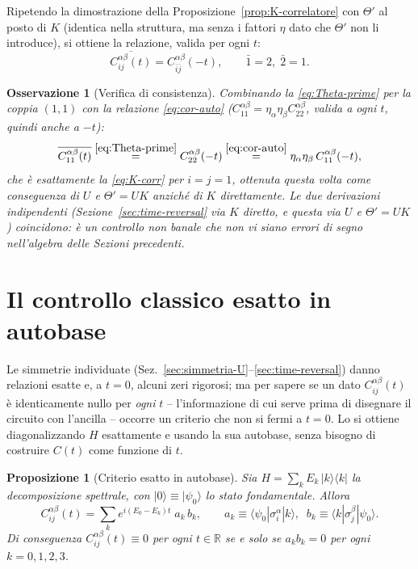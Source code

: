 \documentclass[11pt,a4paper]{article}
\newtheorem{proposizione}{Proposizione}
\newtheorem{osservazione}{Osservazione}
\begin{document}
Ripetendo la dimostrazione della Proposizione~\ref{prop:K-correlatore} con $\Theta'$ al posto di
$K$ (identica nella struttura, ma senza i fattori $\eta$ dato che $\Theta'$ non li introduce),
si ottiene la relazione, valida per ogni $t$:
\begin{equation}
\overline{C_{ij}^{\alpha\beta}(t)} = C_{\bar i\bar j}^{\alpha\beta}(-t),
\qquad \bar 1=2,\;\bar 2=1.
\label{eq:Theta-prime}
\end{equation}

\begin{osservazione}[Verifica di consistenza]
Combinando la \eqref{eq:Theta-prime} per la coppia $(1,1)$ con la relazione
\eqref{eq:cor-auto} ($C_{11}^{\alpha\beta}=\eta_\alpha\eta_\beta C_{22}^{\alpha\beta}$, valida a
ogni $t$, quindi anche a $-t$):
\begin{equation}
\overline{C_{11}^{\alpha\beta}(t)} \overset{\eqref{eq:Theta-prime}}{=} C_{22}^{\alpha\beta}(-t)
\overset{\eqref{eq:cor-auto}}{=} \eta_\alpha\eta_\beta\,C_{11}^{\alpha\beta}(-t),
\end{equation}
che è \emph{esattamente} la \eqref{eq:K-corr} per $i=j=1$, ottenuta questa volta come
conseguenza di $U$ e $\Theta'=UK$ anziché di $K$ direttamente. Le due derivazioni indipendenti
(Sezione~\ref{sec:time-reversal} via $K$ diretto, e questa via $U$ e $\Theta'=UK$) coincidono:
è un controllo non banale che non vi siano errori di segno nell'algebra delle Sezioni
precedenti.
\end{osservazione}

\section{Il controllo classico esatto in autobase}
\label{sec:controllo-numerico}

Le simmetrie individuate (Sez.~\ref{sec:simmetria-U}--\ref{sec:time-reversal}) danno relazioni
esatte e, a $t=0$, alcuni zeri rigorosi; ma per sapere se un dato $C_{ij}^{\alpha\beta}(t)$ è
identicamente nullo per \emph{ogni} $t$ -- l'informazione di cui serve prima di disegnare il
circuito con l'ancilla -- occorre un criterio che non si fermi a $t=0$. Lo si ottiene
diagonalizzando $H$ esattamente e usando la sua autobase, senza bisogno di costruire $C(t)$ come
funzione di $t$.

\begin{proposizione}[Criterio esatto in autobase]
\label{prop:autobase}
Sia $H=\sum_k E_k\,|k\rangle\langle k|$ la decomposizione spettrale, con $|0\rangle\equiv|\psi_0\rangle$
lo stato fondamentale. Allora
\begin{equation}
C_{ij}^{\alpha\beta}(t) = \sum_k e^{i(E_0-E_k)t}\; a_k\, b_k,
\qquad a_k \equiv \langle\psi_0|\sigma_i^\alpha|k\rangle,\;\;
b_k \equiv \langle k|\sigma_j^\beta|\psi_0\rangle.
\label{eq:spettrale}
\end{equation}
Di conseguenza $C_{ij}^{\alpha\beta}(t)\equiv0$ per ogni $t\in\mathbb R$ se e solo se
$a_kb_k=0$ per ogni $k=0,1,2,3$.
\end{proposizione}
\end{document}
